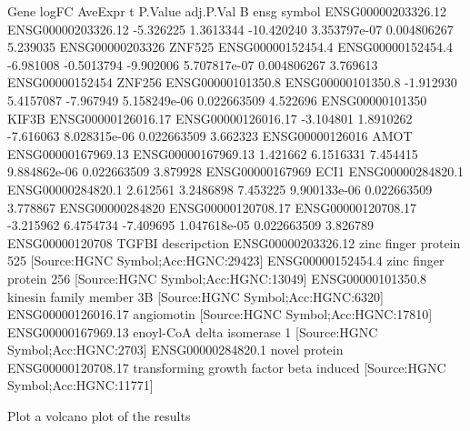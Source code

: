 \documentclass[
]{article}
\newenvironment{Shaded}{\begin{snugshade}}{\end{snugshade}}
\newcommand{\NormalTok}[1]{#1}
\begin{document}
\begin{Shaded}
\begin{Highlighting}[]
\NormalTok{                                 Gene     logFC    AveExpr          t      P.Value   adj.P.Val        B            ensg symbol}
\NormalTok{ENSG00000203326.12 ENSG00000203326.12 {-}5.326225  1.3613344 {-}10.420240 3.353797e{-}07 0.004806267 5.239035 ENSG00000203326 ZNF525}
\NormalTok{ENSG00000152454.4   ENSG00000152454.4 {-}6.981008 {-}0.5013794  {-}9.902006 5.707817e{-}07 0.004806267 3.769613 ENSG00000152454 ZNF256}
\NormalTok{ENSG00000101350.8   ENSG00000101350.8 {-}1.912930  5.4157087  {-}7.967949 5.158249e{-}06 0.022663509 4.522696 ENSG00000101350  KIF3B}
\NormalTok{ENSG00000126016.17 ENSG00000126016.17 {-}3.104801  1.8910262  {-}7.616063 8.028315e{-}06 0.022663509 3.662323 ENSG00000126016   AMOT}
\NormalTok{ENSG00000167969.13 ENSG00000167969.13  1.421662  6.1516331   7.454415 9.884862e{-}06 0.022663509 3.879928 ENSG00000167969   ECI1}
\NormalTok{ENSG00000284820.1   ENSG00000284820.1  2.612561  3.2486898   7.453225 9.900133e{-}06 0.022663509 3.778867 ENSG00000284820}
\NormalTok{ENSG00000120708.17 ENSG00000120708.17 {-}3.215962  6.4754734  {-}7.409695 1.047618e{-}05 0.022663509 3.826789 ENSG00000120708  TGFBI}
\NormalTok{                                                                                  descripction}
\NormalTok{ENSG00000203326.12                 zinc finger protein 525 [Source:HGNC Symbol;Acc:HGNC:29423]}
\NormalTok{ENSG00000152454.4                  zinc finger protein 256 [Source:HGNC Symbol;Acc:HGNC:13049]}
\NormalTok{ENSG00000101350.8                  kinesin family member 3B [Source:HGNC Symbol;Acc:HGNC:6320]}
\NormalTok{ENSG00000126016.17                              angiomotin [Source:HGNC Symbol;Acc:HGNC:17810]}
\NormalTok{ENSG00000167969.13              enoyl{-}CoA delta isomerase 1 [Source:HGNC Symbol;Acc:HGNC:2703]}
\NormalTok{ENSG00000284820.1                                                                novel protein}
\NormalTok{ENSG00000120708.17 transforming growth factor beta induced [Source:HGNC Symbol;Acc:HGNC:11771]}
\end{Highlighting}
\end{Shaded}

Plot a volcano plot of the results
\end{document}
